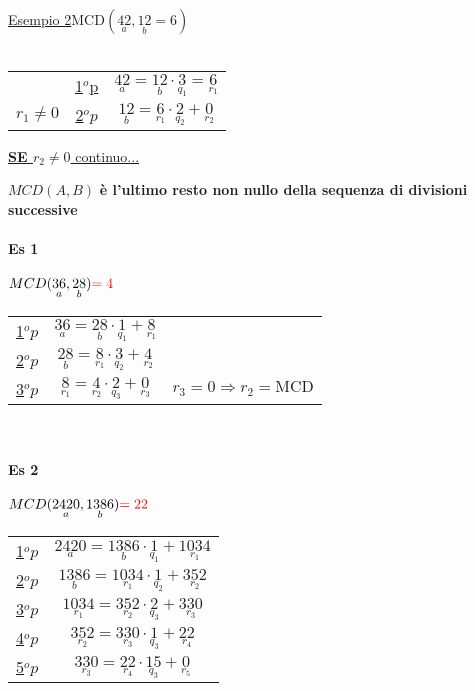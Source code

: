 \begin{description}
            \underline{Esempio 2}\hspace{0.5cm}MCD$(\underset{a}{42},\underset{b}{12}=6)$ \\\\
            \begin{tabular}{c c c}
                & \underline{1$^o$p} & 
                $\underset{a}{42}=\underset{b}{12}\cdot\underset{q_1}{3}=\underset{r_1}{6}$\\
                \underline{$r_1\neq 0$} & \underline{2$^o p$} & 
                $\underset{b}{12}=\underset{r_1}{6}\cdot\underset{q_2}{2}+\underset{r_2}{0}$
            \end{tabular}
            \underline{\textbf{SE $r_2\neq 0$} continuo...} 
            \begin{center}
                {\large{$MCD(A,B)$ \textbf{è l'ultimo resto non nullo della sequenza di divisioni successive}}}
            \end{center}
            \paragraph{Es 1} $MCD(\underset{a}{36},\underset{b}{28}){\color{red}=4}$\\
            \begin{tabular}{c c c}
                \underline{1$^o p$} & $\underset{a}{36}=\underset{b}{28}\cdot\underset{q_1}{1}+\underset{r_1}{8}$  &\\
                \underline{2$^o p$} & $\underset{b}{28}=\underset{r_1}{8}\cdot\underset{q_2}{3}+\underset{r_2}{4}$ &  \\
                \underline{3$^o p$} & $\underset{r_1}{8}=\underset{r_2}{4}\cdot\underset{q_3}{2}+\underset{r_3}{0}$ & 
                $r_3=0\Longrightarrow r_2=\textrm{MCD}$
            \end{tabular}\\
            \paragraph{Es 2} $MCD(\underset{a}{2420},\underset{b}{1386}){\color{red}=22}$\\
            \begin{tabular}{c c}
                \underline{1$^o p$} & $\underset{a}{2420}=\underset{b}{1386}\cdot\underset{q_1}{1}+\underset{r_1}{1034}$  \\
                \underline{2$^o p$} & $\underset{b}{1386}=\underset{r_1}{1034}\cdot\underset{q_2}{1}+\underset{r_2}{352}$   \\
                \underline{3$^o p$} & $\underset{r_1}{1034}=\underset{r_2}{352}\cdot\underset{q_3}{2}+\underset{r_3}{330}$ \\ 
                \underline{4$^o p$} & $\underset{r_2}{352}=\underset{r_3}{330}\cdot\underset{q_3}{1}+\underset{r_4}{22}$ \\ 
                \underline{5$^o p$} & $\underset{r_3}{330}=\underset{r_4}{22}\cdot\underset{q_3}{15}+\underset{r_5}{0}$  
            \end{tabular}\\
    \end{description}
